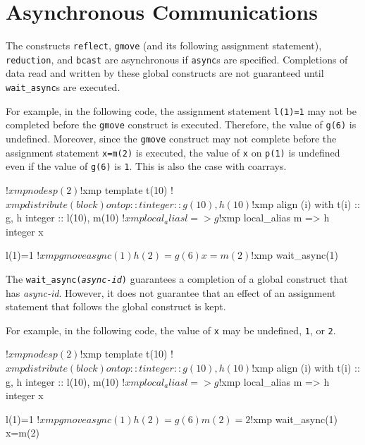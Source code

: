 \section{Asynchronous Communications}

The constructs \texttt{reflect}, \texttt{gmove} (and its following
assignment statement), \texttt{reduction}, and \texttt{bcast} are asynchronous
if \texttt{async}s are specified.  Completions of data read and
written by these global constructs are not guaranteed until
\texttt{wait\_async}s are executed.

For example, in the following code, the assignment statement \texttt{l(1)=1} may
not be completed before the \texttt{gmove} construct is executed.
Therefore, the value of \texttt{g(6)} is undefined.  Moreover, since
the \texttt{gmove} construct may not complete before the assignment statement
\texttt{x=m(2)} is executed, the value of \texttt{x} on \texttt{p(1)}
is undefined even if the value of \texttt{g(6)} is \texttt{1}.  This
is also the case with coarrays.
\begin{center}
\begin{XFexample}
!$xmp nodes p(2)
!$xmp template t(10)
!$xmp distribute (block) onto p :: t
       integer :: g(10), h(10)
!$xmp align (i) with t(i) :: g, h
       integer :: l(10), m(10)
!$xmp local_alias l => g
!$xmp local_alias m => h
       integer x

l(1)=1
!$xmp gmove async(1)
h(2)=g(6)
x=m(2)
!$xmp wait_async(1)
\end{XFexample}
\end{center}

The \texttt{wait\_async(\textit{async-id})} guarantees a completion of
a global construct that has \textit{async-id}.  However, it does not
guarantee that an effect of an assignment statement that follows the global
construct is kept.

For example, in the following code, the value of \texttt{x} may be
undefined, \texttt{1}, or \texttt{2}.
\begin{center}
\begin{XFexample}
!$xmp nodes p(2)
!$xmp template t(10)
!$xmp distribute (block) onto p :: t
       integer :: g(10), h(10)
!$xmp align (i) with t(i) :: g, h
       integer :: l(10), m(10)
!$xmp local_alias l => g
!$xmp local_alias m => h
       integer x

l(1)=1
!$xmp gmove async(1)
h(2)=g(6)
m(2)=2
!$xmp wait_async(1)
x=m(2)
\end{XFexample}
\end{center}



%


